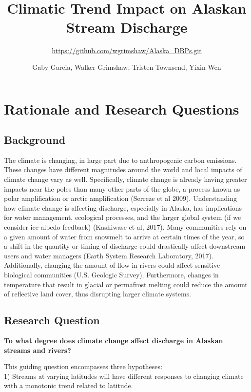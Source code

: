 \documentclass[12pt,]{article}
\title{Climatic Trend Impact on Alaskan Stream Discharge}
\subtitle{\url{https://github.com/wgrimshaw/Alaska_DBPs.git}}
\author{Gaby Garcia, Walker Grimshaw, Tristen Townsend, Yixin Wen}
\date{}
\begin{document}
\maketitle

\newpage

\hypertarget{rationale-and-research-questions}{%
\section{Rationale and Research
Questions}\label{rationale-and-research-questions}}

\hypertarget{background}{%
\subsection{Background}\label{background}}

The climate is changing, in large part due to anthropogenic carbon
emissions. These changes have different magnitudes around the world and
local impacts of climate change vary as well. Specifically, climate
change is already having greater impacts near the poles than many other
parts of the globe, a process known as polar amplification or arctic
amplification (Serreze et al 2009). Understanding how climate change is
affecting discharge, especially in Alaska, has implications for water
management, ecological processes, and the larger global system (if we
consider ice-albedo feedback) (Kashiwase et al, 2017). Many communities
rely on a given amount of water from snowmelt to arrive at certain times
of the year, so a shift in the quantity or timing of discharge could
drastically affect downstream users and water managers (Earth System
Research Laboratory, 2017). Additionally, changing the amount of flow in
rivers could affect sensitive biological communities (U.S. Geologic
Survey). Furthermore, changes in temperature that result in glacial or
permafrost melting could reduce the amount of reflective land cover,
thus disrupting larger climate systems.

\hypertarget{research-question}{%
\subsection{Research Question}\label{research-question}}

\textbf{To what degree does climate change affect discharge in Alaskan
streams and rivers?}

This guiding question encompasses three hypotheses:\\
1) Streams at varying latitudes will have different responses to
changing climate with a monotonic trend related to latitude.
\end{document}
